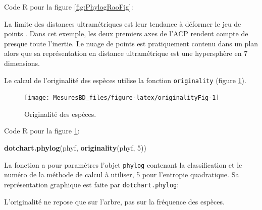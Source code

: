\documentclass[
  11pt,
  french,
  a4paper,
  extrafontsizes,onecolumn,openright
  ]{memoir}
\newenvironment{Shaded}{\begin{snugshade}}{\end{snugshade}}
\newcommand{\DecValTok}[1]{\textcolor[rgb]{0.00,0.00,0.81}{#1}}
\newcommand{\KeywordTok}[1]{\textcolor[rgb]{0.13,0.29,0.53}{\textbf{#1}}}
\newcommand{\NormalTok}[1]{#1}
\newcommand{\OperatorTok}[1]{\textcolor[rgb]{0.81,0.36,0.00}{\textbf{#1}}}
\begin{document}
\normalsize

Code R pour la figure \ref{fig:PhylogRaoFig}:

\scriptsize

\begin{Shaded}
\end{Shaded}

\normalsize

La limite des distances ultramétriques est leur tendance à déformer le jeu de points \autocite{Pavoine2005a}.
Dans cet exemple, les deux premiers axes de l'ACP rendent compte de presque toute l'inertie.
Le nuage de points est pratiquement contenu dans un plan alors que sa représentation en distance ultramétrique est une hypersphère en 7 dimensions.

Le calcul de l'originalité des espèces utilise la fonction \texttt{originality} (figure \ref{fig:originalityFig}).

\scriptsize

\begin{figure}

{\centering \texttt{[image: MesuresBD\_files/figure-latex/originalityFig-1]} 

}

\caption{Originalité des espèces.}\label{fig:originalityFig}
\end{figure}

\normalsize

Code R pour la figure \ref{fig:originalityFig}:

\scriptsize

\begin{Shaded}
\begin{Highlighting}[]
\KeywordTok{dotchart.phylog}\NormalTok{(phyf, }\KeywordTok{originality}\NormalTok{(phyf, }\DecValTok{5}\NormalTok{))}
\end{Highlighting}
\end{Shaded}

\normalsize

La fonction a pour paramètres l'objet \texttt{phylog} contenant la classification et le numéro de la méthode de calcul à utiliser, 5 pour l'entropie quadratique.
Sa représentation graphique est faite par \texttt{dotchart.phylog}:

L'originalité ne repose que sur l'arbre, pas sur la fréquence des espèces.
\end{document}
